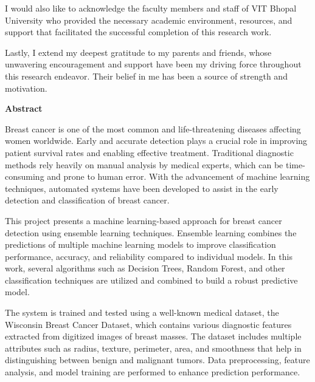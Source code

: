\documentclass[12pt]{article}
\begin{document}
\noindent I would also like to acknowledge the faculty members and staff of VIT Bhopal University who provided the necessary academic environment, resources, and support that facilitated the successful completion of this research work.

\vspace{0.5cm}

\noindent Lastly, I extend my deepest gratitude to my parents and friends, whose unwavering encouragement and support have been my driving force throughout this research endeavor. Their belief in me has been a source of strength and motivation.

\newpage
\begin{center}
    \textbf{\Large Abstract}
\end{center}

\vspace{1cm}

\noindent Breast cancer is one of the most common and life-threatening diseases affecting women worldwide. Early and accurate detection plays a crucial role in improving patient survival rates and enabling effective treatment. Traditional diagnostic methods rely heavily on manual analysis by medical experts, which can be time-consuming and prone to human error. With the advancement of machine learning techniques, automated systems have been developed to assist in the early detection and classification of breast cancer.

\vspace{0.3cm}

\noindent This project presents a machine learning-based approach for breast cancer detection using ensemble learning techniques. Ensemble learning combines the predictions of multiple machine learning models to improve classification performance, accuracy, and reliability compared to individual models. In this work, several algorithms such as Decision Trees, Random Forest, and other classification techniques are utilized and combined to build a robust predictive model.

\vspace{0.3cm}

\noindent The system is trained and tested using a well-known medical dataset, the Wisconsin Breast Cancer Dataset, which contains various diagnostic features extracted from digitized images of breast masses. The dataset includes multiple attributes such as radius, texture, perimeter, area, and smoothness that help in distinguishing between benign and malignant tumors. Data preprocessing, feature analysis, and model training are performed to enhance prediction performance.
\end{document}
